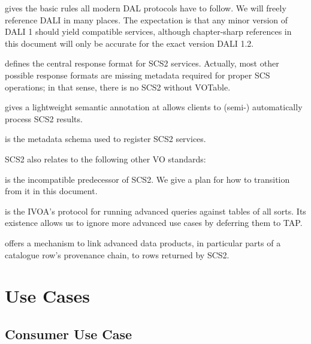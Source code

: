 \documentclass[11pt,a4paper]{ivoa}
\begin{document}
\begin{bigdescription}
\item[DALI] \citet{2017ivoa.spec.0517D} gives the basic rules all modern
DAL protocols have to follow.  We will freely reference DALI in many
places.  The expectation is that any minor version of DALI 1 should yield
compatible services, although chapter-sharp references in this document
will only be accurate for the exact version DALI 1.2.

\item[VOTable] \citet{2025ivoa.spec.0116O} defines the central response
format for SCS2 services.  Actually, most other possible response
formats are missing metadata required for proper SCS operations; in that
sense, there is no SCS2 without VOTable.

\item[UCD] \citet{2005ivoa.spec.0819D} gives a lightweight semantic
annotation at allows clients to (semi-) automatically process SCS2
results.

\item[VODataService] \citet{2021ivoa.spec.1102D} is the metadata schema
used to register SCS2 services.

\end{bigdescription}

SCS2 also relates to the following other VO standards:

\begin{bigdescription}
 \item[ConeSearch 1] \citet{2008ivoa.specQ0222P} is the incompatible
predecessor of SCS2.  We give a plan for how to transition from it in
this document.

\item[TAP] \citet{2019ivoa.spec.0927D} is the IVOA's protocol for
running advanced queries against tables of all sorts.  Its existence
allows us to ignore more advanced use cases by deferring them to TAP.

\item[DataLink] \citet{2023ivoa.spec.1215B} offers a mechanism to link
advanced data products, in particular parts of a catalogue row's
provenance chain, to rows returned by SCS2.
\end{bigdescription}

\section{Use Cases}

\subsection{Consumer Use Case}
\end{document}
